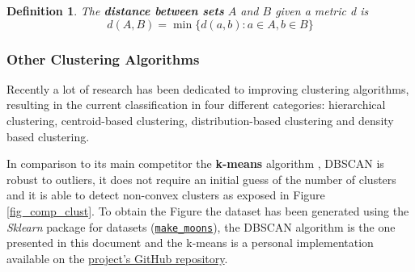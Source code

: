 \documentclass[10pt,journal,compsoc]{IEEEtran}
\newtheorem{definition}{Definition}
\begin{document}
\begin{definition} \label{def_distance}
The \textbf{distance between sets} $A$ and $B$ given a metric d is
$$d(A,B)=\min \lbrace d(a,b): a \in A, b \in B \rbrace$$
\end{definition}

\subsubsection{Other Clustering Algorithms} \label{sec:other-clust-alg}

Recently a lot of research has been dedicated to improving clustering algorithms, resulting in the current classification in four different categories: hierarchical clustering, centroid-based clustering, distribution-based clustering and density based clustering.

In comparison to its main competitor the \textbf{k-means} algorithm \cite{kmeans}, DBSCAN is robust to outliers, it does not require an initial guess of the number of clusters and it is able to detect non-convex clusters as exposed in Figure \ref{fig_comp_clust}. To obtain the Figure the dataset has been generated using the \textit{Sklearn} package for datasets (\href{http://scikit-learn.org/stable/modules/generated/sklearn.datasets.make_moons.html}{\texttt{make\_moons}}), the DBSCAN algorithm is the one presented in this document and the k-means is a personal implementation available on the \href{https://github.com/csegarragonz/DBSCAN-pyCOMPSs}{project's GitHub repository}.
\end{document}
